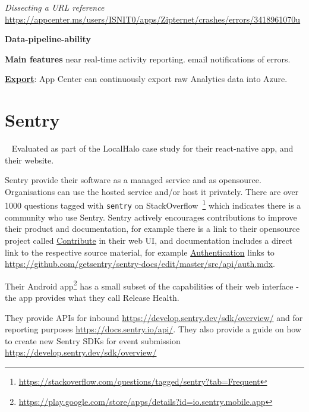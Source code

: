 \emph{Dissecting a URL reference}
\url{https://appcenter.ms/users/ISNIT0/apps/Zipternet/crashes/errors/3418961070u}


\textbf{Data-pipeline-ability}


\textbf{Main features}
near real-time activity reporting.
email notifications of errors.

\href{https://docs.microsoft.com/en-us/appcenter/analytics/export}{\textbf{Export}}: App Center can continuously export raw Analytics data into Azure.

\section{Sentry}~\label{analytics-tools-sentry}
Evaluated as part of the LocalHalo case study for their react-native app, and their website.

Sentry provide their software as a managed service and as opensource. Organisations can use the hosted service and/or host it privately. There are over 1000 questions tagged with \texttt{sentry} on StackOverflow~\footnote{\url{https://stackoverflow.com/questions/tagged/sentry?tab=Frequent}} which indicates there is a community who use Sentry. Sentry actively encourages contributions to improve their product and documentation, for example there is a link to their opensource project called \href{https://github.com/getsentry/sentry}{Contribute} in their web UI, and documentation includes a direct link to the respective source material, for example \href{https://docs.sentry.io/api/auth/}{Authentication} links to \url{https://github.com/getsentry/sentry-docs/edit/master/src/api/auth.mdx}.

Their Android app\footnote{\url{https://play.google.com/store/apps/details?id=io.sentry.mobile.app}} has a small subset of the capabilities of their web interface - the app provides what they call Release Health.

They provide APIs for inbound \url{https://develop.sentry.dev/sdk/overview/} and for reporting purposes \url{https://docs.sentry.io/api/}. They also provide a guide on how to create new Sentry SDKs for event submission \url{https://develop.sentry.dev/sdk/overview/}

